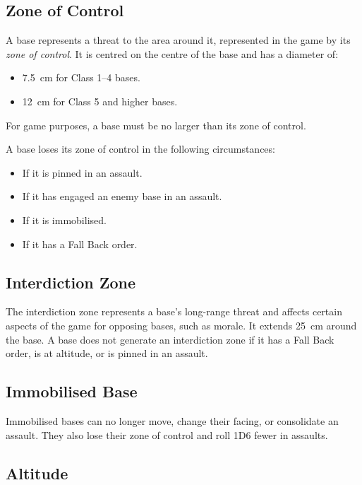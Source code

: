 \subsection{Zone of Control}

A base represents a threat to the area around it, represented in the game by its \textit{zone of control}. It is centred on the centre of the base and has a diameter of:

\begin{itemize}
    \item 7.5~cm for Class 1--4 bases.
    \item 12~cm for Class 5 and higher bases.
\end{itemize}

For game purposes, a base must be no larger than its zone of control.

A base loses its zone of control in the following circumstances:

\begin{itemize}
    \item If it is pinned in an assault.
    \item If it has engaged an enemy base in an assault.
    \item If it is immobilised.
    \item If it has a Fall Back order.
\end{itemize}

\subsection{Interdiction Zone}

The interdiction zone represents a base's long-range threat and affects certain aspects of the game for opposing bases, such as morale. It extends 25~cm around the base. A base does not generate an interdiction zone if it has a Fall Back order, is at altitude, or is pinned in an assault.

\subsection{Immobilised Base}

Immobilised bases can no longer move, change their facing, or consolidate an assault. They also lose their zone of control and roll 1D6 fewer in assaults.

\subsection{Altitude}

